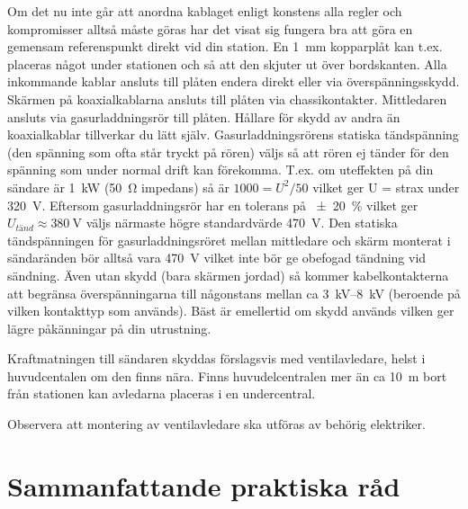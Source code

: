 Om det nu inte går att anordna kablaget enligt konstens alla regler och
kompromisser alltså måste göras har det visat sig fungera bra att göra en
gemensam referenspunkt direkt vid din station.
En \qty{1}{\milli\metre} kopparplåt kan t.ex. placeras något under stationen och
så att den skjuter ut över bordskanten.
Alla inkommande kablar ansluts till plåten endera direkt eller via
överspänningsskydd.
Skärmen på koaxialkablarna ansluts till plåten via chassikontakter.
Mittledaren ansluts via gasurladdningsrör till plåten.
Hållare för skydd av andra än koaxialkablar tillverkar du lätt själv.
Gasurladdningsrörens statiska tändspänning (den spänning som ofta står tryckt på
rören) väljs så att rören ej tänder för den spänning som under normal drift kan
förekomma.
T.ex. om uteffekten på din sändare är \qty{1}{\kilo\watt} (\qty{50}{\ohm}
impedans) så är \(1000 = U^{2}/50\) vilket ger U = strax under \qty{320}{\volt}.
Eftersom gasurladdningsrör har en tolerans på \qty{+-20}{\percent} vilket ger
\(U_{tänd} \approx \qty{380}{\volt}\) väljs närmaste högre standardvärde
\qty{470}{\volt}.
Den statiska tändspänningen för gasurladdningsröret mellan mittledare och skärm
monterat i sändaränden bör alltså vara \qty{470}{\volt} vilket inte bör ge
obefogad tändning vid sändning.
Även utan skydd (bara skärmen jordad) så kommer kabelkontakterna att begränsa
överspänningarna till någonstans mellan ca \qtyrange{3}{8}{\kilo\volt} (beroende
på vilken kontakttyp som används).
Bäst är emellertid om skydd används vilken ger lägre påkänningar på din utrustning.

Kraftmatningen till sändaren skyddas förslagsvis med ventilavledare, helst i
huvudcentalen om den finns nära.
Finns huvudelcentralen mer än ca \qty{10}{\metre} bort från stationen kan
avledarna placeras i en undercentral.


Observera att montering av ventilavledare ska utföras av behörig elektriker.

\section{Sammanfattande praktiska råd}

